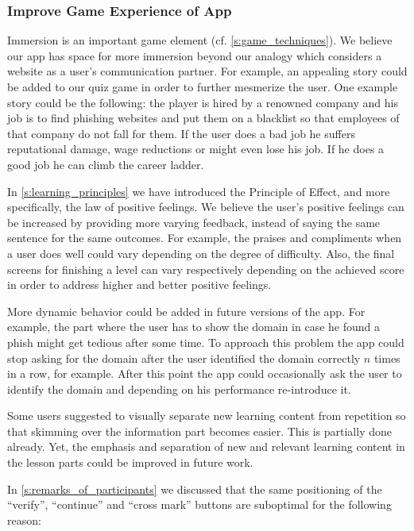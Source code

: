 \subsubsection{Improve Game Experience of App}
\begin{description}[leftmargin=0cm]
	\item[Increase Immersion:] Immersion is an important game element (cf. \autoref{s:game_techniques}).
	We believe our app has space for more immersion beyond our analogy which considers a website as a user's communication partner.
	For example, an appealing story could be added to our quiz game in order to further mesmerize the user. One example story could be the following: the player is hired by a renowned company and his job is to find phishing websites and put them on a blacklist so that employees of that company do not fall for them. If the user does a bad job he suffers reputational damage, wage reductions or might even lose his job. If he does a good job he can climb the career ladder.
	\item[Increase Effect:] In \autoref{s:learning_principles} we have introduced the Principle of Effect, and more specifically, the law of positive feelings. 
	We believe the user's positive feelings can be increased by providing more varying feedback, instead of saying the same sentence for the same outcomes.
	For example, the praises and compliments when a user does well could vary depending on the degree of difficulty.
	Also, the final screens for finishing a level can vary respectively depending on the achieved score in order to address higher and better positive feelings.
	\item[Performance Dependent App Behavior:] More dynamic behavior could be added in future versions of the app.
For example, the part where the user has to show the domain in case he found a phish might get tedious after some time.
To approach this problem the app could stop asking for the domain after the user identified the domain correctly $n$ times in a row, for example.
After this point the app could occasionally ask the user to identify the domain and depending on his performance re-introduce it. 
\item[Text Highlighting]
Some users suggested to visually separate new learning content from repetition so that skimming over the information part becomes easier. 
This is partially done already. Yet, the emphasis and separation of new and relevant learning content in the lesson parts could be improved in future work.
\item[Improved Button Positioning:] In \autoref{s:remarks_of_participants} we discussed that the same positioning of the ``verify'', ``continue'' and ``cross mark'' buttons are suboptimal for the following reason:

\end{description}
